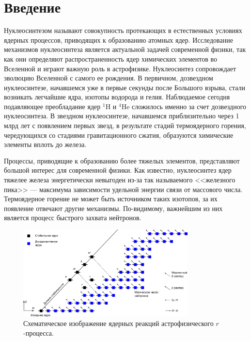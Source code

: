 \section{Введение}%
Нуклеосинтезом называют совокупность протекающих в естественных условиях ядерных процессов, приводящих к образованию атомных ядер. Исследование механизмов нуклеосинтеза является актуальной задачей современной физики, так как они определяют распространенность ядер химических элементов во Вселенной и играют важную роль в астрофизике. Нуклеосинтез сопровождает эволюцию Вселенной с самого ее рождения. В первичном, дозвездном нуклеосинтезе, начавшемся уже в первые секунды после Большого взрыва, стали возникать легчайшие ядра, изотопы водорода и гелия. Наблюдаемое сегодня подавляющее преобладание ядер ${}^1$H и ${}^4$He сложилось именно за счет дозвездного нуклеосинтеза. В звездном нуклеосинтезе, начавшемся приблизительно через 1 млрд лет с появлением первых звезд, в результате стадий термоядерного горения, чередующихся со стадиями гравитационного сжатия, образуются химические элементы вплоть до железа. 

Процессы, приводящие к образованию более тяжелых элементов, представляют большой интерес для современной физики. Как известно, нуклеосинтез ядер тяжелее железа энергетически невыгоден из-за так называемого <<железного пика>> --- максимума зависимости удельной энергии связи от массового числа. Термоядерное горение не может быть источником таких изотопов, за их появление отвечают другие механизмы. По-видимому, важнейшим из них является процесс быстрого захвата нейтронов.

\begin{figure}[!b]
  \centering
  \includegraphics[width=0.8\textwidth]{../pics/tracks.pdf}
  \caption{Схематическое изображение ядерных реакций астрофизического $r$-процесса.}
  \label{fig:tracks}
\end{figure}

